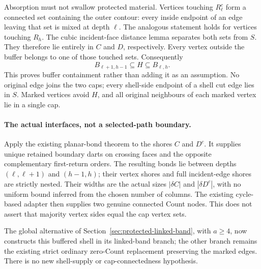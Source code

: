 Absorption must not swallow protected material. Vertices touching
$R_\ell^c$ form a connected set containing the outer contour: every
inside endpoint of an edge leaving that set is mixed at depth $\ell$.
The analogous statement holds for vertices touching $R_h$. The cubic
incident-face distance lemma separates both sets from $S$. They therefore
lie entirely in $C$ and $D$, respectively. Every vertex outside the
buffer belongs to one of those touched sets. Consequently
\[
                 B_{\ell+1,h-1}\subseteq H\subseteq B_{\ell,h}.
\]
This proves buffer containment rather than adding it as an assumption.
No original edge joins the two caps; every shell-side endpoint of a
shell cut edge lies in $S$. Marked vertices avoid $H$, and all original
neighbours of each marked vertex lie in a single cap.

\paragraph{The actual interfaces, not a selected-path boundary.}
Apply the existing planar-bond theorem to the shores $C$ and $D^c$.
It supplies unique retained boundary darts on crossing faces and the
opposite complementary first-return orders. The resulting bonds lie
between depths $(\ell,\ell+1)$ and $(h-1,h)$; their vertex shores and
full incident-edge shores are strictly nested. Their widths are the
actual sizes $|\delta C|$ and $|\delta D^c|$, with no uniform bound
inferred from the chosen number of columns. The existing cycle-based
adapter then supplies two genuine connected Count nodes. This does
not assert that majority vertex sides equal the cap vertex sets.

The global alternative of Section~\ref{sec:protected-linked-band}, with
$a\geq4$, now constructs this buffered shell in its linked-band branch;
the other branch remains the existing strict ordinary zero-Count
replacement preserving the marked edges. There is no new shell-supply
or cap-connectedness hypothesis.

